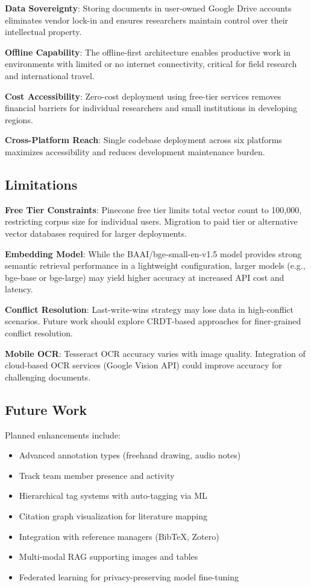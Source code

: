 \documentclass[conference]{IEEEtran}
\begin{document}
\textbf{Data Sovereignty}: Storing documents in user-owned Google Drive accounts eliminates vendor lock-in and ensures researchers maintain control over their intellectual property.

\textbf{Offline Capability}: The offline-first architecture enables productive work in environments with limited or no internet connectivity, critical for field research and international travel.

\textbf{Cost Accessibility}: Zero-cost deployment using free-tier services removes financial barriers for individual researchers and small institutions in developing regions.

\textbf{Cross-Platform Reach}: Single codebase deployment across six platforms maximizes accessibility and reduces development maintenance burden.

\subsection{Limitations}

\textbf{Free Tier Constraints}: Pinecone free tier limits total vector count to 100,000, restricting corpus size for individual users. Migration to paid tier or alternative vector databases required for larger deployments.

\textbf{Embedding Model}: While the BAAI/bge-small-en-v1.5 model provides strong semantic retrieval performance in a lightweight configuration, larger models (e.g., bge-base or bge-large) may yield higher accuracy at increased API cost and latency.


\textbf{Conflict Resolution}: Last-write-wins strategy may lose data in high-conflict scenarios. Future work should explore CRDT-based approaches for finer-grained conflict resolution.

\textbf{Mobile OCR}: Tesseract OCR accuracy varies with image quality. Integration of cloud-based OCR services (Google Vision API) could improve accuracy for challenging documents.

\subsection{Future Work}

Planned enhancements include:

\begin{itemize}
\item Advanced annotation types (freehand drawing, audio notes)
\item Track team member presence and activity
\item Hierarchical tag systems with auto-tagging via ML
\item Citation graph visualization for literature mapping
\item Integration with reference managers (BibTeX, Zotero)
\item Multi-modal RAG supporting images and tables
\item Federated learning for privacy-preserving model fine-tuning
\end{itemize}
\end{document}

